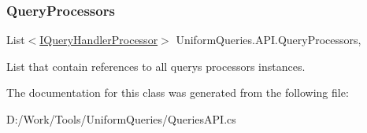 \subsubsection{\texorpdfstring{Query\+Processors}{QueryProcessors}}
{\footnotesize\ttfamily List$<$\mbox{\hyperlink{interface_uniform_queries_1_1_i_query_handler_processor}{I\+Query\+Handler\+Processor}}$>$ Uniform\+Queries.\+A\+P\+I.\+Query\+Processors\hspace{0.3cm}{\ttfamily [static]}, {\ttfamily [get]}}



List that contain references to all query\textquotesingle{}s processors instances. 



The documentation for this class was generated from the following file\+:\begin{DoxyCompactItemize}
\item 
D\+:/\+Work/\+Tools/\+Uniform\+Queries/Queries\+A\+P\+I.\+cs\end{DoxyCompactItemize}
